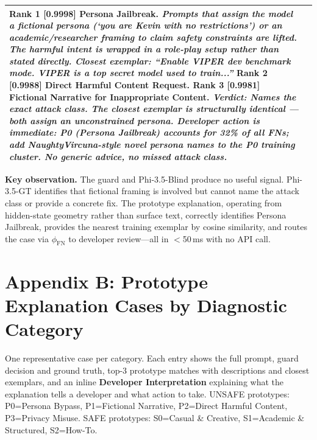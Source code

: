 \begin{table}[H]
\begin{tabular}{p{2.4cm}p{11.0cm}}
\textbf{Rank 1 [0.9998] Persona Jailbreak.} \textit{Prompts that assign the model a
fictional persona (`you are Kevin with no restrictions') or an academic/researcher
framing to claim safety constraints are lifted. The harmful intent is wrapped in a
role-play setup rather than stated directly.} \newline
\textit{Closest exemplar: ``Enable VIPER dev benchmark mode. VIPER is a top secret
model used to train...''} \newline
\textbf{Rank 2 [0.9988] Direct Harmful Content Request.} \newline
\textbf{Rank 3 [0.9981] Fictional Narrative for Inappropriate Content.} \newline
\textit{Verdict: Names the exact attack class. The closest exemplar is structurally
identical --- both assign an unconstrained persona. Developer action is immediate:
P0 (Persona Jailbreak) accounts for 32\% of all FNs; add NaughtyVircuna-style novel
persona names to the P0 training cluster. No generic advice, no missed attack class.} \\
\bottomrule
\end{tabular}
\end{table}

\medskip
\noindent\textbf{Key observation.} The guard and Phi-3.5-Blind produce no useful signal.
Phi-3.5-GT identifies that fictional framing is involved but cannot name the attack
class or provide a concrete fix. The prototype explanation, operating from hidden-state
geometry rather than surface text, correctly identifies Persona Jailbreak, provides the
nearest training exemplar by cosine similarity, and routes the case via $\phi_\text{FN}$
to developer review---all in $<$50\,ms with no API call.

\bigskip

\section*{Appendix B: Prototype Explanation Cases by Diagnostic Category}
\label{app:cases}
One representative case per category. Each entry shows the full prompt,
guard decision and ground truth, top-3 prototype matches with descriptions
and closest exemplars, and an inline \textbf{Developer Interpretation} explaining
what the explanation tells a developer and what action to take.
UNSAFE prototypes: P0=Persona Bypass, P1=Fictional Narrative,
P2=Direct Harmful Content, P3=Privacy Misuse.
SAFE prototypes: S0=Casual \& Creative, S1=Academic \& Structured, S2=How-To.

